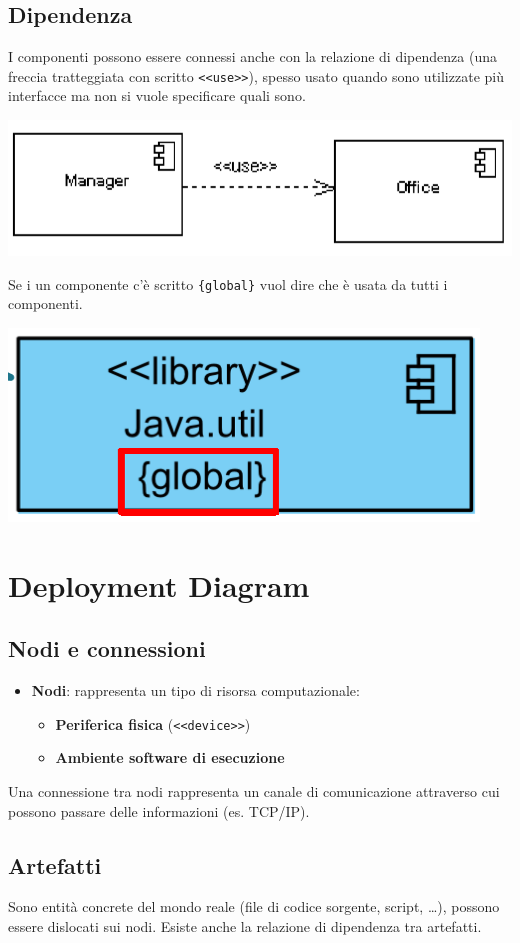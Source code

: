 \documentclass[12pt, a4paper]{report}
\begin{document}
\subsection{Dipendenza}
I componenti possono essere connessi anche con la relazione di dipendenza (una freccia tratteggiata con scritto \texttt{<<use>>}), spesso usato quando sono utilizzate più interfacce ma non si vuole specificare quali sono.
\begin{center}
    \includegraphics[width=.6\textwidth]{Immagini/dependence.png}
\end{center}
Se i un componente c'è scritto \texttt{\{global\}} vuol dire che è usata da tutti i componenti.
\begin{center}
    \includegraphics[width=.3\textwidth]{Immagini/global.png}
\end{center}
\section{Deployment Diagram}
\subsection{Nodi e connessioni}
\begin{itemize}
    \item \textbf{Nodi}: rappresenta un tipo di risorsa computazionale: \begin{itemize}
        \item \textbf{Periferica fisica} (\texttt{<<device>>})
        \item \textbf{Ambiente software di esecuzione}
    \end{itemize}
\end{itemize}
Una connessione tra nodi rappresenta un canale di comunicazione attraverso cui possono passare delle informazioni (es. TCP/IP).
\subsection{Artefatti}
Sono entità concrete del mondo reale (file di codice sorgente, script, \dots),  possono essere dislocati sui nodi. Esiste anche la relazione di dipendenza tra artefatti.
\end{document}
